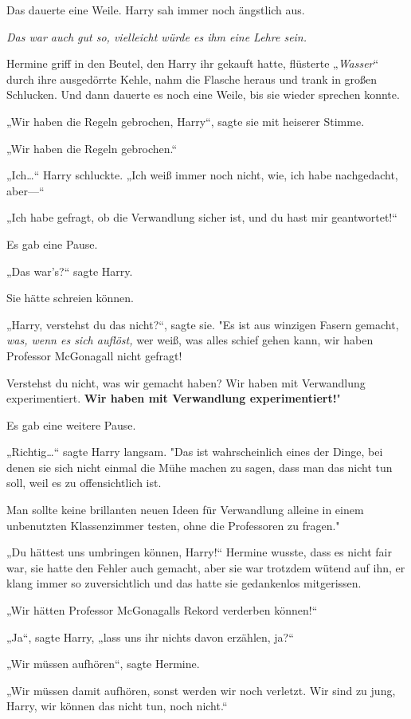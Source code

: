 {Das dauerte eine Weile. Harry sah immer noch ängstlich aus.

\emph{Das war auch gut so, vielleicht würde es ihm eine Lehre sein.}

Hermine griff in den Beutel, den Harry ihr gekauft hatte, flüsterte „\emph{Wasser}“ durch ihre ausgedörrte Kehle, nahm die Flasche heraus und trank in großen Schlucken. Und dann dauerte es noch eine Weile, bis sie wieder sprechen konnte.

„Wir haben die Regeln gebrochen, Harry“, sagte sie mit heiserer Stimme.

„Wir haben die Regeln gebrochen.“

„Ich…“ Harry schluckte. „Ich weiß immer noch nicht, wie, ich habe nachgedacht, aber—“

„Ich habe gefragt, ob die Verwandlung sicher ist, und du hast mir geantwortet!“

Es gab eine Pause.

„Das war's?“ sagte Harry.

Sie hätte schreien können.

„Harry, verstehst du das nicht?“, sagte sie. "Es ist aus winzigen Fasern gemacht, \emph{was, wenn es sich auflöst,} wer weiß, was alles schief gehen kann, wir haben Professor McGonagall nicht gefragt!

Verstehst du nicht, was wir gemacht haben? Wir haben mit Verwandlung experimentiert. \textbf{Wir haben mit Verwandlung experimentiert!}"

Es gab eine weitere Pause.

„Richtig…“ sagte Harry langsam. "Das ist wahrscheinlich eines der Dinge, bei denen sie sich nicht einmal die Mühe machen zu sagen, dass man das nicht tun soll, weil es zu offensichtlich ist.

Man sollte keine brillanten neuen Ideen für Verwandlung alleine in einem unbenutzten Klassenzimmer testen, ohne die Professoren zu fragen."

„Du hättest uns umbringen können, Harry!“ Hermine wusste, dass es nicht fair war, sie hatte den Fehler auch gemacht, aber sie war trotzdem wütend auf ihn, er klang immer so zuversichtlich und das hatte sie gedankenlos mitgerissen.

„Wir hätten Professor McGonagalls Rekord verderben können!“

„Ja“, sagte Harry, „lass uns ihr nichts davon erzählen, ja?“

„Wir müssen aufhören“, sagte Hermine.

„Wir müssen damit aufhören, sonst werden wir noch verletzt. Wir sind zu jung, Harry, wir können das nicht tun, noch nicht.“

}
